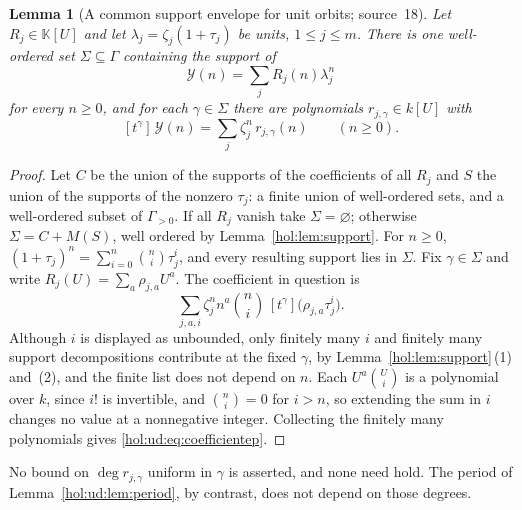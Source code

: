 \documentclass[11pt]{article}
\numberwithin{equation}{section}
\newtheorem{lemma}[theorem]{Lemma}
\theoremstyle{definition}
\theoremstyle{remark}
\newcommand{\KK}{\mathbb K}
\begin{document}
\begin{lemma}[A common support envelope for unit orbits; source~18]
\label{hol:ud:lem:envelope}
Let $R_j\in\KK[U]$ and let $\lambda_j=\zeta_j(1+\tau_j)$ be units,
$1\le j\le m$. There is one well-ordered set $\Sigma\subseteq\Gamma$
containing the support of
\[
 \mathcal Y(n)=\sum_jR_j(n)\lambda_j^n
\]
for every $n\ge0$, and for each $\gamma\in\Sigma$ there are polynomials
$r_{j,\gamma}\in k[U]$ with
\begin{equation}\label{hol:ud:eq:coefficientep}
 [t^\gamma]\,\mathcal Y(n)=\sum_j\zeta_j^n\,r_{j,\gamma}(n)\qquad(n\ge0).
\end{equation}
\end{lemma}

\begin{proof}
Let $C$ be the union of the supports of the coefficients of all $R_j$ and $S$
the union of the supports of the nonzero $\tau_j$: a finite union of
well-ordered sets, and a well-ordered subset of $\Gamma_{>0}$. If all $R_j$
vanish take $\Sigma=\varnothing$; otherwise $\Sigma=C+M(S)$, well ordered by
Lemma~\ref{hol:lem:support}. For $n\ge0$,
$(1+\tau_j)^n=\sum_{i=0}^n\binom ni\tau_j^i$, and every resulting support lies
in $\Sigma$. Fix $\gamma\in\Sigma$ and write $R_j(U)=\sum_a\rho_{j,a}U^a$. The
coefficient in question is
\begin{equation}\label{hol:ud:eq:coefficientexpansion}
 \sum_{j,a,i}\zeta_j^nn^a\binom ni\,[t^\gamma]\bigl(\rho_{j,a}\tau_j^i\bigr).
\end{equation}
Although $i$ is displayed as unbounded, only finitely many $i$ and finitely
many support decompositions contribute at the fixed $\gamma$, by
Lemma~\ref{hol:lem:support}\,(1) and~(2), and the finite list does not depend
on $n$. Each $U^a\binom Ui$ is a polynomial over $k$, since $i!$ is
invertible, and $\binom ni=0$ for $i>n$, so extending the sum in $i$ changes no
value at a nonnegative integer. Collecting the finitely many polynomials gives
\eqref{hol:ud:eq:coefficientep}.
\end{proof}

No bound on $\deg r_{j,\gamma}$ uniform in $\gamma$ is asserted, and none need
hold. The period of Lemma~\ref{hol:ud:lem:period}, by contrast, does not
depend on those degrees.
\end{document}
